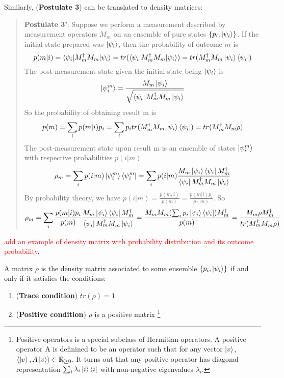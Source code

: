 Similarly, (\textbf{Postulate 3}) can be translated to density matrices:
\begin{quote}
    {\bf{Postulate 3'}}: Suppose we perform a measurement described by measurement operators $M_m$ on an ensemble of pure states $\{p_i, \ket{\psi_i}\}$. If the initial state prepared was $\ket{\psi_i}$, then the probability of outcome $m$ is
    \begin{equation}
        p(m|i)=\braket{\psi_i|M_m^\dagger M_m|\psi_i}=tr(\braket{\psi_i|M_m^\dagger M_m|\psi_i})=tr(M_m^\dagger M_m \ket{\psi_i}\bra{\psi_i})
    \end{equation}
    The post-measurement state given the initial state being $\ket{\psi_i}$ is
    \begin{equation}
        \ket{\psi_i^m}=\frac{M_m \ket{\psi_i}}{\sqrt{\bra{\psi_i}M_m^\dagger M_m \ket{\psi_i}}}
    \end{equation}
    So the probability of obtaining result m is
    \begin{equation}
        p(m)=\sum_i p(m|i)p_i=\sum_i p_i tr(M_m^\dagger M_m \ket{\psi_i}\bra{\psi_i})=tr(M_m^\dagger M_m \rho)
    \end{equation}
    The post-measurement state upon result m is an ensemble of states $\ket{\psi_i^m}$ with respective probabilities $p(i|m)$
    \begin{equation}
        \rho_m = \sum_i p(i|m)\ket{\psi_i^m}\bra{\psi_i^m}=\sum_i p(i|m)\frac{M_m \ket{\psi_i}\bra{\psi_i}M_m^\dagger}{\bra{\psi_i}M_m^\dagger M_m \ket{\psi_i}}
    \end{equation}
    By probability theory, we have $p(i|m)=\frac{p(m,i)}{p(m)}=\frac{p(m|i)p_i}{p(m)}$. So
    \begin{equation}
        \rho_m=\sum_i \frac{p(m|i)p_i}{p(m)}\frac{M_m \ket{\psi_i}\bra{\psi_i}M_m^\dagger}{\bra{\psi_i}M_m^\dagger M_m \ket{\psi_i}}=\frac{M_m M_m (\sum_i p_i \ket{\psi_i}\bra{\psi_i})M_m^\dagger}{p(m)}=\frac{M_m \rho M_m^\dagger}{tr(M_m^\dagger M_m \rho)}
    \end{equation}
\end{quote}



\textcolor{red}{add an example of density matrix with probability distribution and its outcome probability}.

\begin{theorem}
A matrix $\rho$ is the density matrix associated to some ensemble $\{p_i, \ket{\psi_i}\}$ if and only if it satisfies the conditions:
\begin{enumerate}
    \item (\textbf{Trace condition}) $tr(\rho)=1$
    \item (\textbf{Positive condition}) $\rho$ is a positive matrix \footnote{Positive operators is a special subclass of Hermitian operators. A positive operator A is definined to be an operator such that for any vector $\ket{v}$, $\langle \ket{v}, A\ket{v} \rangle \in \mathbb{R}_{\ge 0}$. It turns out that any positive operator has diagonal representation $\sum_i \lambda_i \ket{i}\bra{i}$ with non-negative eigenvalues $\lambda_i$.} 
\end{enumerate}
\end{theorem}

